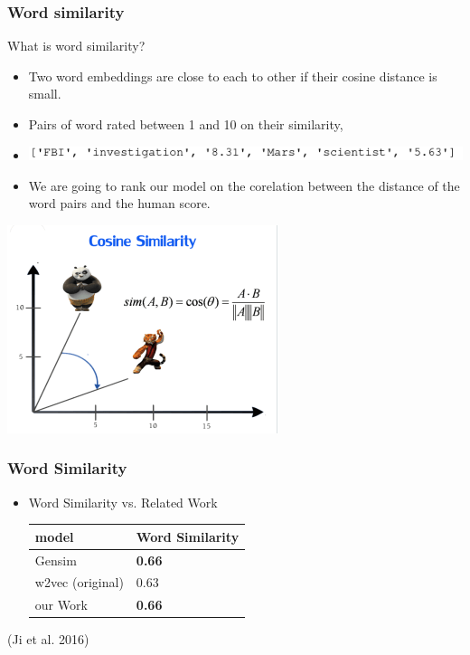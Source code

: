 \begin{frame}
\frametitle{Word similarity}
\begin{Large}
What is word similarity? 
\end{Large}
\medskip
\begin{itemize}
\item Two word embeddings are close to each to other if their cosine distance is small. 
\item Pairs of word rated between 1 and 10 on their similarity, 
\item \includegraphics[scale=0.5]{images/wordsim353_example}
\item We are going to rank our model on the corelation between the distance of the word pairs and the human score.
\end{itemize}
\centerline{ \includegraphics[scale=0.4]{images/cosine}}
\end{frame}
\begin{frame}
\frametitle{Word Similarity}
\begin{itemize}

\item Word Similarity vs. Related Work
\begin{table}[]
\begin{tabular}{|l|l|}
\hline
model         & Word Similarity \\ \hline
Gensim           & \textbf{ 0.66   }        \\ \hline
w2vec (original) & 0.63           \\ \hline
our Work         & \textbf{0.66}       \\ \hline
\end{tabular}
\end{table}
\end{itemize}
\hfill (Ji et al. 2016) \cite{intel}
\end{frame}

